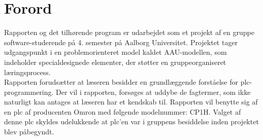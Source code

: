 \section*{Forord}
\label{sec:forord}
Rapporten og det tilhørende program er udarbejdet som et projekt af en gruppe software-studerende på 4. semester på Aalborg Universitet. Projektet tager udgangspunkt i en problemorienteret model kaldet AAU-modellen, som indeholder specialdesignede elementer, der støtter en gruppeorganiseret læringsprocess. \\

\noindent Rapporten forudsætter at læseren besidder en grundlæggende forståelse for \gls{plc}-programmering. Der vil i rapporten, forsøges at uddybe de fagtermer, som ikke naturligt kan antages at læseren har et kendskab til. Rapporten vil benytte sig af en \gls{plc} af producenten Omron med følgende modelnummer: CP1H. Valget af denne \gls{plc} skyldes udelukkende at \gls{plc}'en var i gruppens besiddelse inden projektet blev påbegyndt.